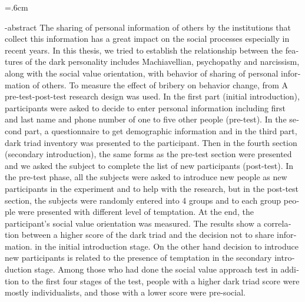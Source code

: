 
\baselineskip=.6cm
\begin{latin}
\en-abstract{
    The sharing of personal information of others by the institutions that collect this information has a great impact on the social processes
especially in recent years. In this thesis, we tried to establish the relationship between the features
of the dark personality includes Machiavellian, psychopathy and narcissism, along with the  social value orientation, with behavior
of sharing of personal information of others. To measure the effect of bribery on behavior change, from
A pre-test-post-test research design was used. In the first part (initial introduction), participants were asked to
decide to enter personal information including first and last name and phone number of one to five other people
(pre-test). In the second part, a questionnaire to get demographic information and in the third part, dark triad inventory was presented to the participant.
Then in the fourth section (secondary introduction), the same forms as the pre-test section were presented
and we asked the subject to complete the list of new participants (post-test). In the pre-test phase, all
the subjects were asked to introduce new people as new participants in the experiment and to help with the 
research, but in the post-test section, the subjects were randomly entered into 4 groups and to each group
people were presented with different level of temptation. At the end, the participant's social value orientation
was measured. The results show a correlation between a higher score of the dark triad and the decision not to share information.
in the initial introduction stage. On the other hand  decision to introduce new participants is related to the presence of temptation in the secondary introduction stage.
 Among those who had done the social value approach test in addition to the first four stages of the test, people with a higher dark triad score
were mostly individualists, and those with a lower score were pre-social.
}


\end{latin}
